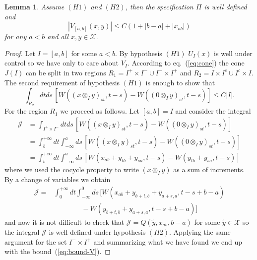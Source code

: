 \documentclass[a4paper,12pt,reqno]{amsart}
\newtheorem{lemma}[theorem]{Lemma}
\newcommand{\X}{\mathcal{X}}
\begin{document}
\begin{lemma}
\label{lemma:good-pi}
Assume $(H1)$ and $(H2)$, then the specification $\Pi$ is well defined and
\begin{equation}
  \label{eq:bound-V}
  |V_{[a,b]}(x,y)| \le C (1+|b-a|+|x_{ab}|) 
\end{equation}
for any $a<b$ and all $x,y \in \X$.
\end{lemma}
\begin{proof}
Let $I = [a,b]$ for some $a<b$.
By hypothesis $(H1)$ $U_I(x)$ is well under control so we have only to care about $V_I$. According to eq.~(\ref{eq:cone}) the cone $J(I)$ can be split in two regions $R_1 = I^+ \times I^- \cup I^- \times I^+$ and $R_2 = I \times I^c \cup I^c \times I$. The second requirement of hypothesis $(H1)$ is enough to show that
\begin{equation*}
  \int_{R_2} dt ds \, [W((x \otimes_I y)_{st},t-s) -W((0 \otimes_I y)_{st},t-s) ] \le C |I|.
\end{equation*}
For the region $R_1$ we proceed as follows. Let $[a,b]=I$ and consider the integral
\begin{equation*}
  \begin{split}
\mathcal{J} & = \int_{I^+\times I^-} dt ds\, [W((x \otimes_I y)_{st},t-s) -W((0 \otimes_I y)_{st},t-s) ]  
\\ & = \int^{+\infty}_b dt \int_{-\infty}^a ds \, [W((x \otimes_I y)_{st},t-s) -W((0 \otimes_I y)_{st},t-s) ]  
\\ & = \int^{+\infty}_b dt \int_{-\infty}^a ds \, [W(x_{ab}+y_{tb}+y_{sa},t-s) -W(y_{tb}+y_{sa},t-s) ]  
  \end{split}
\end{equation*}
where we used the cocycle property to write $(x \otimes_I y)$ as a sum of increments.
By a change of variables we obtain
\begin{equation*}
  \begin{split}
\mathcal{J} = &\int^{+\infty}_0 dt \int_{-\infty}^0 ds \, [W(x_{ab}+y_{b+t,b}+y_{a+s,a},t-s+b-a)
\\ & \qquad \qquad  -W(y_{b+t,b}+y_{a+s,a},t-s+b-a) ]  
  \end{split}
\end{equation*}
and now it is not difficult to check that $\mathcal{J} = Q(\tilde y, x_{ab},b-a)$ for some $\tilde y \in \X$ so the integral $\mathcal{J}$ is well defined under hypothesis $(H2)$. Applying the same argument for the set $I^-\times I^+$ and summarizing what we have found we end up with the bound~(\ref{eq:bound-V}).
\end{proof}
\end{document}
